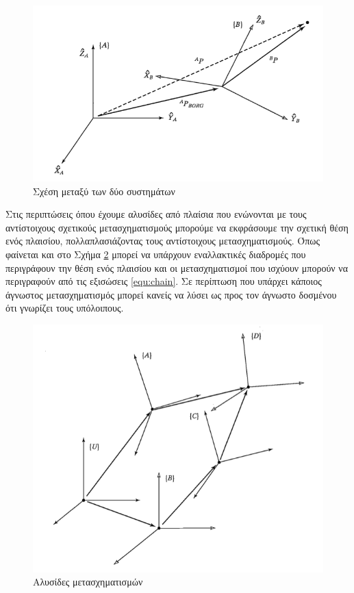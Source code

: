 \begin{figure}[H]
    \centering
    \includegraphics[width=.7\textwidth, keepaspectratio]{fig/transofrmation.png}
    \caption{Σχέση μεταξύ των δύο συστημάτων \cite{craig95}}
    \label{fig:transformation}
\end{figure}

Στις περιπτώσεις όπου έχουμε αλυσίδες από πλαίσια που ενώνονται με τους αντίστοιχους σχετικούς μετασχηματισμούς μπορούμε να εκφράσουμε την σχετική θέση ενός πλαισίου, πολλαπλασιάζοντας τους αντίστοιχους μετασχηματισμούς. Όπως φαίνεται και στο Σχήμα \ref{fig:transformation-chain} μπορεί να υπάρχουν εναλλακτικές διαδρομές που περιγράφουν την θέση ενός πλαισίου και οι μετασχηματισμοί που ισχύουν μπορούν να περιγραφούν από τις εξισώσεις \ref{equ:chain}. Σε περίπτωση που υπάρχει κάποιος άγνωστος μετασχηματισμός μπορεί κανείς να λύσει ως προς τον άγνωστο δοσμένου ότι γνωρίζει τους υπόλοιπους.

\begin{figure}[H]
    \centering
    \includegraphics[width=.7\textwidth, height=.4\textheight, keepaspectratio]{fig/transformation-chain.png}
    \caption{Αλυσίδες μετασχηματισμών \cite{craig95}}
    \label{fig:transformation-chain}
\end{figure}

